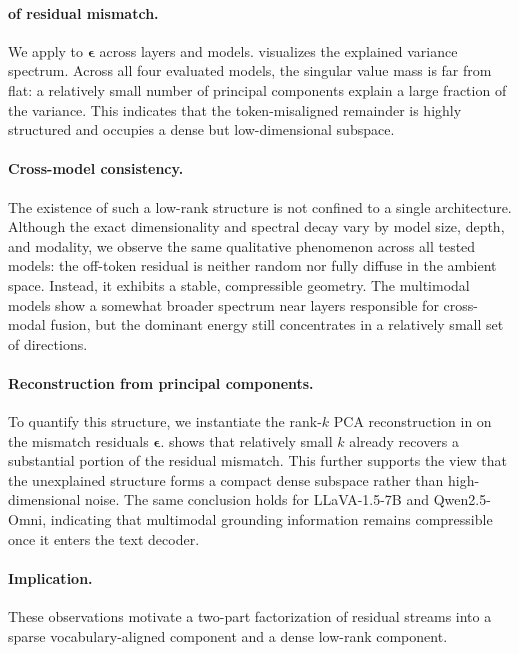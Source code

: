 \documentclass{article}
\begin{document}
\paragraph{ of residual mismatch.}
We apply  to $\boldsymbol{\epsilon}$ across layers and models.
 visualizes the explained variance spectrum.
Across all four evaluated models, the singular value mass is far from flat: a relatively small number of principal components explain a large fraction of the variance.
This indicates that the token-misaligned remainder is highly structured and occupies a dense but low-dimensional subspace.

\paragraph{Cross-model consistency.}
The existence of such a low-rank structure is not confined to a single architecture.
Although the exact dimensionality and spectral decay vary by model size, depth, and modality, we observe the same qualitative phenomenon across all tested models: the off-token residual is neither random nor fully diffuse in the ambient space.
Instead, it exhibits a stable, compressible geometry. The multimodal models show a somewhat broader spectrum near layers responsible for cross-modal fusion, but the dominant energy still concentrates in a relatively small set of directions.

\paragraph{Reconstruction from principal components.}
To quantify this structure, we instantiate the rank-$k$ PCA reconstruction in  on the mismatch residuals $\boldsymbol{\epsilon}$.
 shows that relatively small $k$ already recovers a substantial portion of the residual mismatch.
This further supports the view that the unexplained structure forms a compact dense subspace rather than high-dimensional noise. The same conclusion holds for LLaVA-1.5-7B and Qwen2.5-Omni, indicating that multimodal grounding information remains compressible once it enters the text decoder.

\paragraph{Implication.}
These observations motivate a two-part factorization of residual streams into a sparse vocabulary-aligned component and a dense low-rank component.
\end{document}
